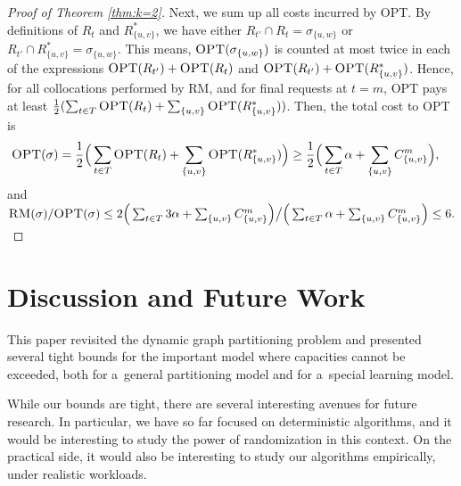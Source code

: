 \documentclass[a4paper,anonymous,USenglish]{lipics-v2019}
\newcommand{\OPT}{\textsc{OPT}\xspace}
\newcommand{\RM}{\textsc{RM}\xspace} %
\newcommand\mahmoud[1]{\color{orange}\textbf{Mahmoud: #1~}\color{black}}
\begin{document}
\begin{proof}[Proof of Theorem \ref{thm:k=2}]
	Next, we sum up all costs incurred by \OPT.
	By definitions of $R_t$ and $R^*_{\{u,v\}}$, we have either
	$R_{t'} \cap R_t = \sigma_{\{u,w\}}$ or
	$R_{t'} \cap R^*_{\{u,v\}} = \sigma_{\{u,w\}}$.
	This means,
	$\OPT ( \sigma_{\{u,w\}})$
	is counted at most twice in each of  the expressions
	$\OPT (R_{t'}) + \OPT (R_t)$
	and  
	$\OPT (R_{t'}) + \OPT(R^*_{\{u,v\}})$.
	Hence,
	for all collocations performed by \RM,
	and for final requests at $t=m$,
	\OPT pays at least 
	$\frac{1}{2}(
	\sum_{ t \in T } \OPT (R_t) +
	\sum_{\{u,v\}}\OPT (R^*_{\{u,v\}})
	) $.
	Then,
	the total cost to \OPT is
	\begin{align*} 	%
		\OPT (\sigma)
		&=
		\frac{1}{2}
		\Big(
		\sum_{ t \in T} \OPT (R_t) 
		+ \sum_{\{u,v\}}\OPT (R^*_{\{u,v\}})
		\Big)	
		\geq
		\frac{1}{2}		
		\Big(
		\sum_{ t \in T} \alpha  
		+ \sum_{\{u,v\}} C^{m}_{\{u,v\}}
		\Big),
	\end{align*}
and
$
	\RM(\sigma)	/
	\OPT (\sigma)
	\leq
	2\Big(
	\sum_{ t \in T} 3\alpha +
	\sum_{\{u,v\}} C^{m}_{\{u,v\}}
	\Big)	 \big /
	\Big(
	\sum_{ t \in T} \alpha  
	+ \sum_{\{u,v\}} C^{m}_{\{u,v\}}  
	\Big) 	\leq 6.
$
\end{proof}

\noindent


\section{Discussion and Future Work}

This paper revisited the dynamic graph partitioning problem and presented several tight bounds for the important model where capacities cannot be exceeded, both for a~general partitioning model and for a~special learning model. 

While our bounds are tight, there are several interesting avenues for future research.
In particular, we have so far focused on deterministic algorithms, and it would be interesting to study the power of randomization in this context.
On the practical side, it would also be interesting to study our algorithms empirically, under realistic workloads.
\end{document}
